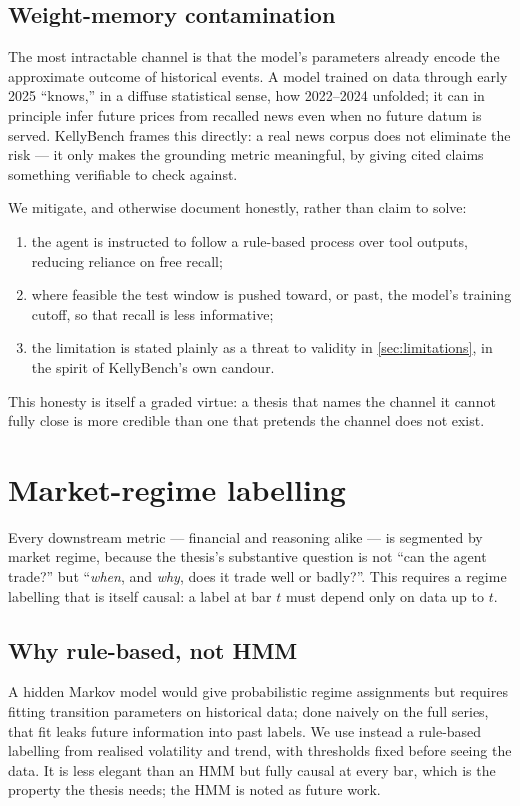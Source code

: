 \subsection{Weight-memory contamination}

The most intractable channel is that the model's parameters already encode the approximate
outcome of historical events. A model trained on data through early 2025 ``knows,'' in a
diffuse statistical sense, how 2022--2024 unfolded; it can in principle infer future prices
from recalled news even when no future datum is served. KellyBench frames this directly: a
real news corpus does not eliminate the risk --- it only makes the grounding metric
meaningful, by giving cited claims something verifiable to check against.

We mitigate, and otherwise document honestly, rather than claim to solve:
\begin{enumerate}
  \item the agent is instructed to follow a rule-based process over tool outputs, reducing
  reliance on free recall;
  \item where feasible the test window is pushed toward, or past, the model's training
  cutoff, so that recall is less informative;
  \item the limitation is stated plainly as a threat to validity in \cref{sec:limitations},
  in the spirit of KellyBench's own candour.
\end{enumerate}
This honesty is itself a graded virtue: a thesis that names the channel it cannot fully
close is more credible than one that pretends the channel does not exist.

\section{Market-regime labelling}
\label{sec:regime}

Every downstream metric --- financial and reasoning alike --- is segmented by market
regime, because the thesis's substantive question is not ``can the agent trade?'' but
``\emph{when}, and \emph{why}, does it trade well or badly?''. This requires a regime
labelling that is itself causal: a label at bar $t$ must depend only on data up to $t$.

\subsection{Why rule-based, not HMM}

A hidden Markov model would give probabilistic regime assignments but requires fitting
transition parameters on historical data; done naively on the full series, that fit leaks
future information into past labels. We use instead a rule-based labelling from realised
volatility and trend, with thresholds fixed before seeing the data. It is less elegant than
an HMM but fully causal at every bar, which is the property the thesis needs; the HMM is
noted as future work.

